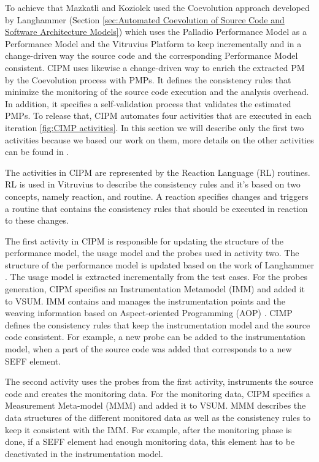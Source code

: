 To achieve that Mazkatli and Koziolek used the Coevolution approach developed by Langhammer (Section \ref{sec:Automated Coevolution of Source Code and Software Architecture Models}) which uses the Palladio Performance Model as a Performance Model and the Vitruvius Platform to keep incrementally and in a change-driven way the source code and the corresponding Performance Model consistent. CIPM uses likewise a change-driven way to enrich the extracted PM by the Coevolution process with PMPs. It defines the consistency rules that minimize the monitoring of the source code execution and the analysis overhead. In addition, it specifies a self-validation process that validates the estimated PMPs. To release that, CIPM automates four activities that are executed in each iteration \ref{fig:CIMP activities}. In this section we will describe only the first two activities because we based our work on them, more details on the other activities can be found in \cite{mazkatli2018continuous}.

The activities in CIPM are represented by the Reaction Language (RL) routines. RL is used in Vitruvius to describe the consistency rules and it's based on two concepts, namely reaction, and routine. A reaction specifies changes and triggers a routine that contains the consistency rules that should be executed in reaction to these changes.  

The first activity in CIPM is responsible for updating the structure of the performance model, the usage model and the probes used in activity two. The structure of the performance model is updated based on the work of Langhammer \cite{langhammer2015co}. The usage model is extracted incrementally from the test cases. For the probes generation, CIPM specifies an Instrumentation Metamodel (IMM) and added it to VSUM. IMM contains and manages the instrumentation points and the weaving information based on Aspect-oriented Programming (AOP) \cite{kiczales1997j}. CIMP defines the consistency rules that keep the instrumentation model and the source code consistent. For example, a new probe can be added to the instrumentation model, when a part of the source code was added that corresponds to a new SEFF element. 

The second activity uses the probes from the first activity, instruments the source code and creates the monitoring data. For the monitoring data, CIPM specifies a Measurement Meta-model (MMM) and added it to VSUM. MMM describes the data structures of the different monitored data as well as the consistency rules to keep it consistent with the IMM. For example, after the monitoring phase is done, if a SEFF element had enough monitoring data, this element has to be deactivated in the instrumentation model. 

